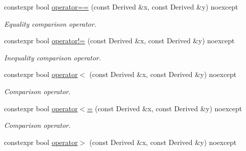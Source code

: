 \begin{DoxyCompactItemize}
\item 
constexpr bool \hyperlink{class_mdt_1_1_numeric_1_1_physics_type_a19bbcf82001900576c9738089b6efda8}{operator==} (const Derived \&x, const Derived \&y) noexcept\hypertarget{class_mdt_1_1_numeric_1_1_physics_type_a19bbcf82001900576c9738089b6efda8}{}\label{class_mdt_1_1_numeric_1_1_physics_type_a19bbcf82001900576c9738089b6efda8}

\begin{DoxyCompactList}\small\item\em Equality comparison operator. \end{DoxyCompactList}\item 
constexpr bool \hyperlink{class_mdt_1_1_numeric_1_1_physics_type_a5a810023f7517c4f4e45ce70c5da90e4}{operator!=} (const Derived \&x, const Derived \&y) noexcept
\begin{DoxyCompactList}\small\item\em Inequality comparison operator. \end{DoxyCompactList}\item 
constexpr bool \hyperlink{class_mdt_1_1_numeric_1_1_physics_type_ada4582d450e1a194357e30c1adb28fc1}{operator$<$} (const Derived \&x, const Derived \&y) noexcept\hypertarget{class_mdt_1_1_numeric_1_1_physics_type_ada4582d450e1a194357e30c1adb28fc1}{}\label{class_mdt_1_1_numeric_1_1_physics_type_ada4582d450e1a194357e30c1adb28fc1}

\begin{DoxyCompactList}\small\item\em Comparison operator. \end{DoxyCompactList}\item 
constexpr bool \hyperlink{class_mdt_1_1_numeric_1_1_physics_type_a0ae0bdb484fc3c65b049303fc74a7143}{operator$<$=} (const Derived \&x, const Derived \&y) noexcept\hypertarget{class_mdt_1_1_numeric_1_1_physics_type_a0ae0bdb484fc3c65b049303fc74a7143}{}\label{class_mdt_1_1_numeric_1_1_physics_type_a0ae0bdb484fc3c65b049303fc74a7143}

\begin{DoxyCompactList}\small\item\em Comparison operator. \end{DoxyCompactList}\item 
constexpr bool \hyperlink{class_mdt_1_1_numeric_1_1_physics_type_a4101b3710a0f4650ad71390d56730267}{operator$>$} (const Derived \&x, const Derived \&y) noexcept\hypertarget{class_mdt_1_1_numeric_1_1_physics_type_a4101b3710a0f4650ad71390d56730267}{}\label{class_mdt_1_1_numeric_1_1_physics_type_a4101b3710a0f4650ad71390d56730267}


\end{DoxyCompactItemize}
